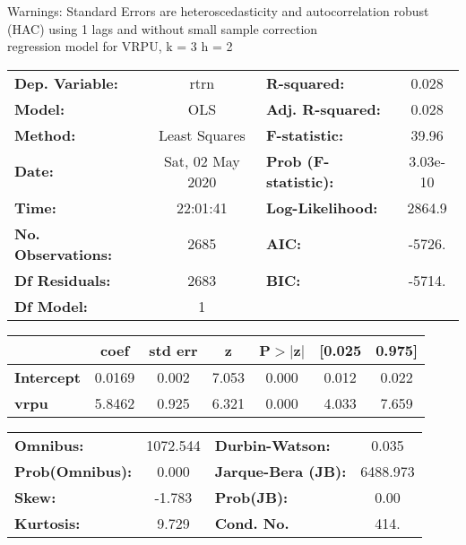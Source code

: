Warnings: \newline
 [1] Standard Errors are heteroscedasticity and autocorrelation robust (HAC) using 1 lags and without small sample correction\\ 

regression model for VRPU, k = 3 h = 2\begin{center}
\begin{tabular}{lclc}
\toprule
\textbf{Dep. Variable:}    &       rtrn       & \textbf{  R-squared:         } &     0.028   \\
\textbf{Model:}            &       OLS        & \textbf{  Adj. R-squared:    } &     0.028   \\
\textbf{Method:}           &  Least Squares   & \textbf{  F-statistic:       } &     39.96   \\
\textbf{Date:}             & Sat, 02 May 2020 & \textbf{  Prob (F-statistic):} &  3.03e-10   \\
\textbf{Time:}             &     22:01:41     & \textbf{  Log-Likelihood:    } &    2864.9   \\
\textbf{No. Observations:} &        2685      & \textbf{  AIC:               } &    -5726.   \\
\textbf{Df Residuals:}     &        2683      & \textbf{  BIC:               } &    -5714.   \\
\textbf{Df Model:}         &           1      & \textbf{                     } &             \\
\bottomrule
\end{tabular}
\begin{tabular}{lcccccc}
                   & \textbf{coef} & \textbf{std err} & \textbf{z} & \textbf{P$> |$z$|$} & \textbf{[0.025} & \textbf{0.975]}  \\
\midrule
\textbf{Intercept} &       0.0169  &        0.002     &     7.053  &         0.000        &        0.012    &        0.022     \\
\textbf{vrpu}      &       5.8462  &        0.925     &     6.321  &         0.000        &        4.033    &        7.659     \\
\bottomrule
\end{tabular}
\begin{tabular}{lclc}
\textbf{Omnibus:}       & 1072.544 & \textbf{  Durbin-Watson:     } &    0.035  \\
\textbf{Prob(Omnibus):} &   0.000  & \textbf{  Jarque-Bera (JB):  } & 6488.973  \\
\textbf{Skew:}          &  -1.783  & \textbf{  Prob(JB):          } &     0.00  \\
\textbf{Kurtosis:}      &   9.729  & \textbf{  Cond. No.          } &     414.  \\
\bottomrule
\end{tabular}
\end{center}

